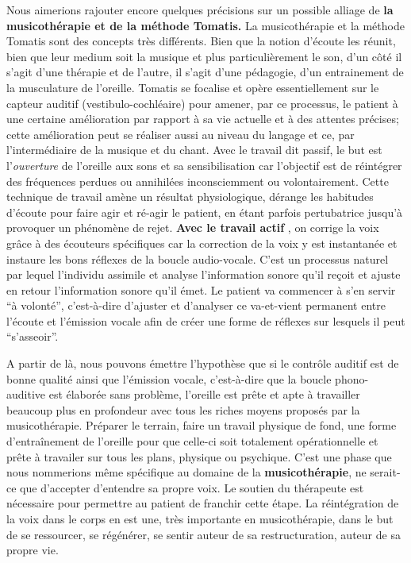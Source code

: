Nous aimerions rajouter encore quelques précisions sur un possible alliage de
\textbf{la musicothérapie et de la méthode Tomatis.}
La musicothérapie et la méthode Tomatis sont des concepts très différents. Bien que la notion d'écoute les réunit, bien que leur medium soit la musique et plus particulièrement le son, d'un côté il s'agit d'une thérapie et de l'autre, il s'agit d'une pédagogie, d'un entrainement de la musculature de l'oreille. 
Tomatis se focalise et opère essentiellement sur le capteur auditif
(vestibulo-cochléaire) pour amener, par ce processus, le patient à une
certaine  amélioration par rapport à sa vie actuelle et à des attentes
précises; cette amélioration peut se réaliser aussi au niveau du
langage et ce, par l'intermédiaire de la musique et du chant.
Avec le travail dit passif, le  but est l'\emph{ouverture} de l'oreille
aux sons et sa sensibilisation car l'objectif est de réintégrer
des fréquences perdues ou annihilées inconsciemment ou volontairement. 
Cette technique de travail amène un résultat
physiologique, dérange les habitudes d'écoute pour faire agir
et ré-agir le patient, en étant parfois pertubatrice jusqu'à provoquer
un phénomène de rejet.
 \textbf{Avec le travail actif }, on corrige la voix grâce à des écouteurs spécifiques 
car la correction de la voix y est instantanée et instaure les bons
réflexes de la boucle audio-vocale. C'est un processus naturel par
lequel l'individu assimile et analyse l'information sonore qu'il reçoit
et ajuste en retour l'information sonore qu'il émet. Le patient va
commencer à s'en servir ``à volonté'', c'est-à-dire d'ajuster et
d'analyser ce va-et-vient permanent entre l'écoute et l'émission vocale
afin de créer une forme de réflexes sur lesquels il peut ``s'asseoir''.%

A partir de là, nous pouvons émettre l'hypothèse que si le contrôle
auditif est de bonne qualité ainsi que l'émission vocale, c'est-à-dire
que la boucle phono-auditive est élaborée sans problème, l'oreille est
prête et apte à travailler beaucoup plus en profondeur avec tous les
riches moyens proposés par la musicothérapie.
Préparer le terrain, faire un travail physique de fond, une
forme d'entraînement de l'oreille pour que celle-ci soit totalement
opérationnelle et prête à travailer sur tous les plans, physique ou psychique.
C'est une phase que nous nommerions même spécifique au domaine de 
la \textbf{musicothérapie}, ne serait-ce que d'accepter d'entendre sa
propre voix.
Le soutien du thérapeute est nécessaire pour permettre
au patient de franchir cette étape. La réintégration de la voix dans
le corps en est une, très importante en musicothérapie, dans le but de
se ressourcer, se régénérer, se
sentir auteur  de sa restructuration, auteur de sa propre vie. 

